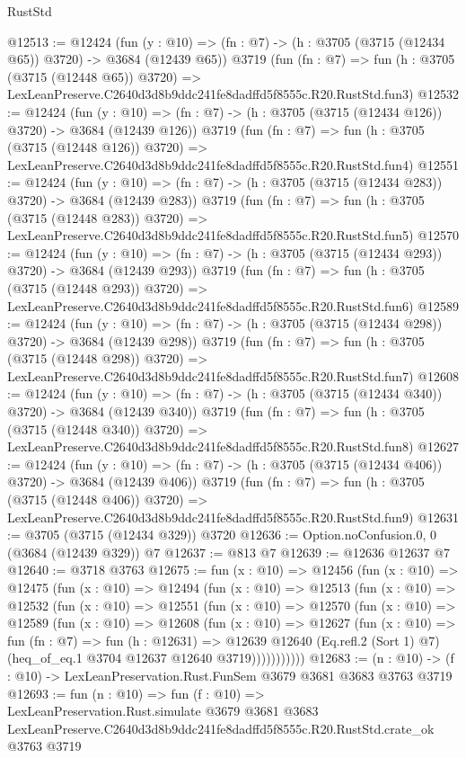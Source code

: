 \begin{lexlean}{RustStd}
\begin{coremodule}
@12513 := @12424
    (fun (y : @10) => (fn : @7) -> (h : @3705 (@3715 (@12434 @65)) @3720) -> @3684 (@12439 @65))
    @3719
    (fun (fn : @7) =>
    fun (h : @3705 (@3715 (@12448 @65)) @3720) =>
    LexLeanPreserve.C2640d3d8b9ddc241fe8dadffd5f8555c.R20.RustStd.fun3)
@12532 := @12424
    (fun (y : @10) => (fn : @7) -> (h : @3705 (@3715 (@12434 @126)) @3720) -> @3684 (@12439 @126))
    @3719
    (fun (fn : @7) =>
    fun (h : @3705 (@3715 (@12448 @126)) @3720) =>
    LexLeanPreserve.C2640d3d8b9ddc241fe8dadffd5f8555c.R20.RustStd.fun4)
@12551 := @12424
    (fun (y : @10) => (fn : @7) -> (h : @3705 (@3715 (@12434 @283)) @3720) -> @3684 (@12439 @283))
    @3719
    (fun (fn : @7) =>
    fun (h : @3705 (@3715 (@12448 @283)) @3720) =>
    LexLeanPreserve.C2640d3d8b9ddc241fe8dadffd5f8555c.R20.RustStd.fun5)
@12570 := @12424
    (fun (y : @10) => (fn : @7) -> (h : @3705 (@3715 (@12434 @293)) @3720) -> @3684 (@12439 @293))
    @3719
    (fun (fn : @7) =>
    fun (h : @3705 (@3715 (@12448 @293)) @3720) =>
    LexLeanPreserve.C2640d3d8b9ddc241fe8dadffd5f8555c.R20.RustStd.fun6)
@12589 := @12424
    (fun (y : @10) => (fn : @7) -> (h : @3705 (@3715 (@12434 @298)) @3720) -> @3684 (@12439 @298))
    @3719
    (fun (fn : @7) =>
    fun (h : @3705 (@3715 (@12448 @298)) @3720) =>
    LexLeanPreserve.C2640d3d8b9ddc241fe8dadffd5f8555c.R20.RustStd.fun7)
@12608 := @12424
    (fun (y : @10) => (fn : @7) -> (h : @3705 (@3715 (@12434 @340)) @3720) -> @3684 (@12439 @340))
    @3719
    (fun (fn : @7) =>
    fun (h : @3705 (@3715 (@12448 @340)) @3720) =>
    LexLeanPreserve.C2640d3d8b9ddc241fe8dadffd5f8555c.R20.RustStd.fun8)
@12627 := @12424
    (fun (y : @10) => (fn : @7) -> (h : @3705 (@3715 (@12434 @406)) @3720) -> @3684 (@12439 @406))
    @3719
    (fun (fn : @7) =>
    fun (h : @3705 (@3715 (@12448 @406)) @3720) =>
    LexLeanPreserve.C2640d3d8b9ddc241fe8dadffd5f8555c.R20.RustStd.fun9)
@12631 := @3705 (@3715 (@12434 @329)) @3720
@12636 := Option.noConfusion.{0, 0} (@3684 (@12439 @329)) @7
@12637 := @813 @7
@12639 := @12636 @12637 @7
@12640 := @3718 @3763
@12675 := fun (x : @10) =>
  @12456
    (fun (x : @10) =>
    @12475
      (fun (x : @10) =>
      @12494
        (fun (x : @10) =>
        @12513
          (fun (x : @10) =>
          @12532
            (fun (x : @10) =>
            @12551
              (fun (x : @10) =>
              @12570
                (fun (x : @10) =>
                @12589
                  (fun (x : @10) =>
                  @12608
                    (fun (x : @10) =>
                    @12627
                      (fun (x : @10) =>
                      fun (fn : @7) =>
                      fun (h : @12631) =>
                      @12639
                        @12640
                        (Eq.refl.{2} (Sort 1) @7)
                        (heq_of_eq.{1} @3704 @12637 @12640 @3719)))))))))))
@12683 := (n : @10) -> (f : @10) -> LexLeanPreservation.Rust.FunSem @3679 @3681 @3683 @3763 @3719
@12693 := fun (n : @10) =>
  fun (f : @10) =>
  LexLeanPreservation.Rust.simulate
    @3679
    @3681
    @3683
    LexLeanPreserve.C2640d3d8b9ddc241fe8dadffd5f8555c.R20.RustStd.crate_ok
    @3763
    @3719
\end{coremodule}
\end{lexlean}
